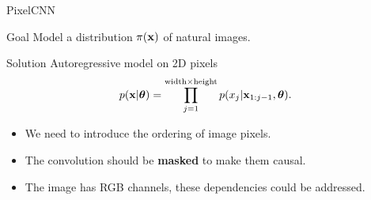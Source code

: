 \begin{frame}{PixelCNN}
	\begin{block}{Goal}
		Model a distribution $\pi(\mathbf{x})$ of natural images.
	\end{block}
	\begin{block}{Solution}
		Autoregressive model on 2D pixels
		\[
		    p(\mathbf{x} | \boldsymbol{\theta}) = \prod_{j=1}^{\text{width} \times \text{height}} p(x_j|\mathbf{x}_{1:j-1}, \boldsymbol{\theta}).
		\]
		\begin{itemize}
			\item We need to introduce the ordering of image pixels.
		    \item The convolution should be \textbf{masked} to make them causal.
		    \item The image has RGB channels, these dependencies could be addressed.
		\end{itemize}
	\end{block}
\end{frame}
